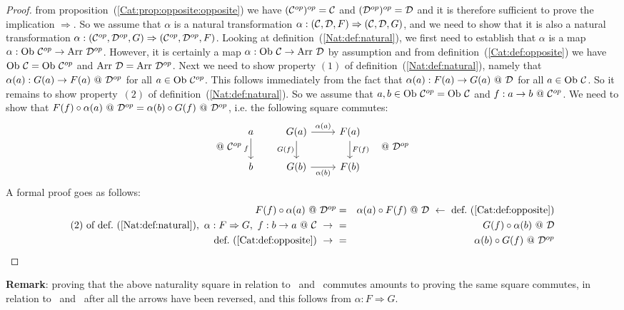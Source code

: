 \begin{proof}
    from proposition~(\ref{Cat:prop:opposite:opposite}) we have
    $(\mbox{${\cal C}^{op}$})^{op}=\mbox{$\cal C$}$ and $(\mbox{${\cal D}^{op}$})^{op}=\mbox{$\cal D$}$ and it is therefore sufficient 
    to prove the implication $\Rightarrow$. So we assume that $\alpha$ is 
    a natural transformation $\alpha:(\mbox{$\cal C$},\mbox{$\cal D$},F)\Rightarrow(\mbox{$\cal C$},\mbox{$\cal D$},G)$,
    and we need to show that it is also a natural transformation
    $\alpha:(\mbox{${\cal C}^{op}$},\mbox{${\cal D}^{op}$},G)\Rightarrow(\mbox{${\cal C}^{op}$},\mbox{${\cal D}^{op}$},F)$. Looking at 
    definition~(\ref{Nat:def:natural}), we first need to establish that
    $\alpha$ is a map $\alpha:\ob\ \Cop\to\arr\ \Dop$. However, it is 
    certainly a map $\alpha:\mbox{\rm Ob}\ \mbox{$\cal C$}\to\mbox{\rm Arr}\ \mbox{$\cal D$}$ by assumption and from 
    definition~(\ref{Cat:def:opposite}) we have $\mbox{\rm Ob}\ \mbox{$\cal C$}=\mbox{\rm Ob}\ \mbox{${\cal C}^{op}$}$ and
    $\mbox{\rm Arr}\ \mbox{$\cal D$}=\mbox{\rm Arr}\ \mbox{${\cal D}^{op}$}$. Next we need to show property $(1)$ of
    definition~(\ref{Nat:def:natural}), namely that 
    $\alpha(a):G(a)\to F(a)\ @\ \mbox{${\cal D}^{op}$}$ for all $a\in\mbox{\rm Ob}\ \mbox{${\cal C}^{op}$}$. This
    follows immediately from the fact that $\alpha(a):F(a)\to G(a)\ @\ \mbox{$\cal D$}$
    for all $a\in\mbox{\rm Ob}\ \mbox{$\cal C$}$. So it remains to show property~$(2)$ of 
    definition~(\ref{Nat:def:natural}). So we assume that $a,b\in\mbox{\rm Ob}\ \mbox{${\cal C}^{op}$}
    =\mbox{\rm Ob}\ \mbox{$\cal C$}$ and $f:a\to b\ @\ \Cop$. We need to show that 
    $F(f)\circ\alpha(a)\ @\ \Dop = \alpha(b)\circ G(f)\ @\ \Dop$, i.e.
    the following square commutes:
    \begin{eqnarray*}@\ \Cop
        &\begin{tikzcd}
            a\arrow[d,swap, "f"]
            &G(a)\arrow[r, "\alpha(a)"]\arrow[d, swap,"G(f)"]
            &F(a)\arrow[d, "F(f)"]
            \\
            b
            &G(b)\arrow[r, swap, "\alpha(b)"]
            &F(b)
        \end{tikzcd}&@\ \Dop
    \end{eqnarray*}
    A formal proof goes as follows:
    \begin{eqnarray*}F(f)\circ\alpha(a)\ @\ \Dop 
        &=&\alpha(a)\circ F(f)\ @\ \Dat
        \ \leftarrow\ \mbox{def.~(\ref{Cat:def:opposite})}\\
        \mbox{$(2)$ of def.~(\ref{Nat:def:natural})},\ 
        \alpha:F\Rightarrow G,\ f:b\to a\ @\ \Cat\ \to\ 
        &=&G(f)\circ\alpha(b)\ @\ \Dat\\
        \mbox{def.~(\ref{Cat:def:opposite})}\ \to\ 
        &=&\alpha(b)\circ G(f)\ @\ \Dop
    \end{eqnarray*}
\end{proof}

\noindent
{\bf Remark}: proving that the above naturality square in relation to \Cop\ and
\Dop\ commutes amounts to proving the same square commutes, in relation to \Cat\ 
and \Dat\ after all the arrows have been reversed, and this follows from 
$\alpha:F\Rightarrow G$.
